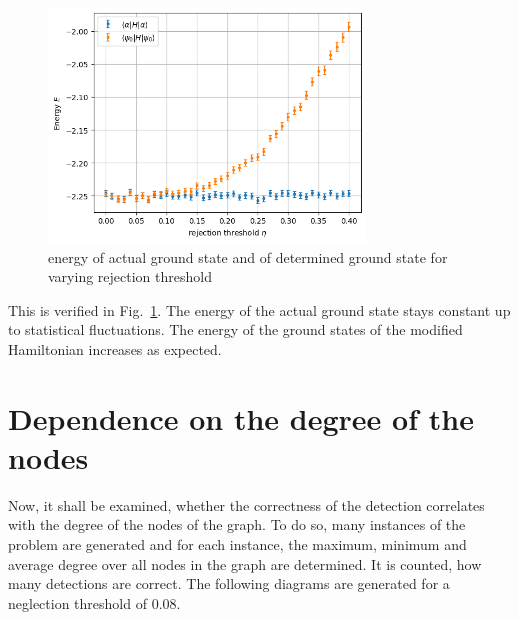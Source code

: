 \documentclass{article}
\begin{document}
	\begin{figure}[h]
		\centering
		\includegraphics[width=0.75\textwidth]{img/energy.png}
		\caption{energy of actual ground state and of determined ground state for varying rejection threshold}
		\label{fig:energy}
	\end{figure}
	This is verified in Fig.~\ref{fig:energy}. The energy of the actual ground state stays constant up to statistical fluctuations. The energy of the ground states of the modified Hamiltonian increases as expected.
	
	
	\section{Dependence on the degree of the nodes}\label{sec:dependence on the degree of the nodes}
	Now, it shall be examined, whether the correctness of the detection correlates with the degree of the nodes of the graph.  To do so, many instances of the problem are generated and for each instance, the maximum, minimum and average degree over all nodes in the graph are determined. It is counted, how many detections are correct. The following diagrams are generated for a neglection threshold of 0.08.
	
\end{document}
